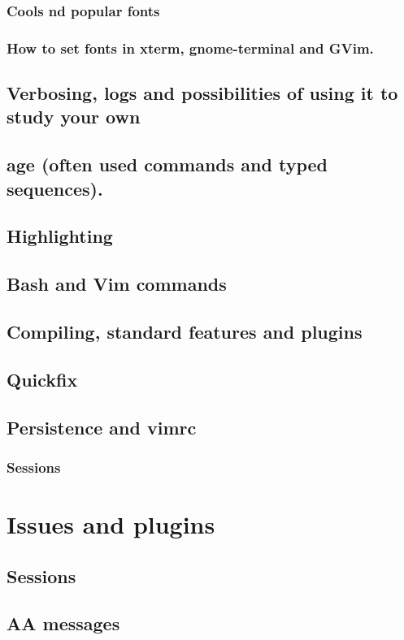 \documentclass{article}
\begin{document}
\subsubsection{Cools nd popular fonts}
\subsubsection{How to set fonts in xterm, gnome-terminal and GVim.}
\subsection{Verbosing, logs and possibilities of using it to study your own}
\subsection{age (often used commands and typed sequences).}
\subsection{Highlighting}
\subsection{Bash and Vim commands}
\subsection{Compiling, standard features and plugins}
\subsection{Quickfix}
\subsection{Persistence and vimrc}
\subsubsection{Sessions}\label{sessions}
\section{Issues and plugins}\label{issues}
\subsection{Sessions}
\subsection{AA messages}
\end{document}
